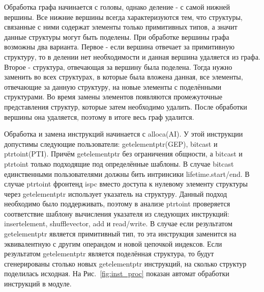 Обработка графа начинается с головы, однако деление - с самой нижней вершины. Все нижние вершины всегда характеризуются тем, что структуры, связанные с ними содержат элементы только примитивных типов, а значит данные структуры могут быть поделены. При обработке вершины графа возможны два варианта. Первое - если вершина отвечает за примитивную структуру, то в делении нет необходимости и данная вершина удаляется из графа. Второе - структура, отвечающая за вершину была поделена. Тогда нужно заменить во всех структурах, в которые была вложена данная, все элементы, отвечающие за данную структуру, на новые элементы с поделёнными структурами. Во время замены элементов появляются промежуточные представления структур, которые затем необходимо удалить. После обработки вершины она удаляется, поэтому в итоге весь граф удалится.

Обработка и замена инструкций начинается с alloca(AI). У этой инструкции допустимы следующие пользователи: getelementptr(GEP), bitcast и ptrtoint(PTI). Причём getelementptr без ограничения общности, а bitcast и ptrtoint только подходящие под определённые шаблоны. В случае bitcast единственными пользователями должны бить интринсики lifetime.start/end. В случае ptrtoint фронтенд ispc вместо доступа к нулевому элементу структуры через getelementptr использует указатель на структуру. Данный подход необходимо было поддерживать, поэтому в анализе ptrtoint проверяется соответствие шаблону вычисления указателя из следующих инструкций: insertelement, shufflevector, add и read/write. В случае если результатом getelementptr является примитивный тип, то эта инструкция заменится на эквивалентную с другим операндом и новой цепочкой индексов. Если результатом getelementptr является поделённая структура, то будут сгенерированы столько новых getelementptr инструкций, на сколько структур поделилась исходная. На Рис.~\ref{fig:inst_proc} показан автомат обработки инструкций в модуле.

